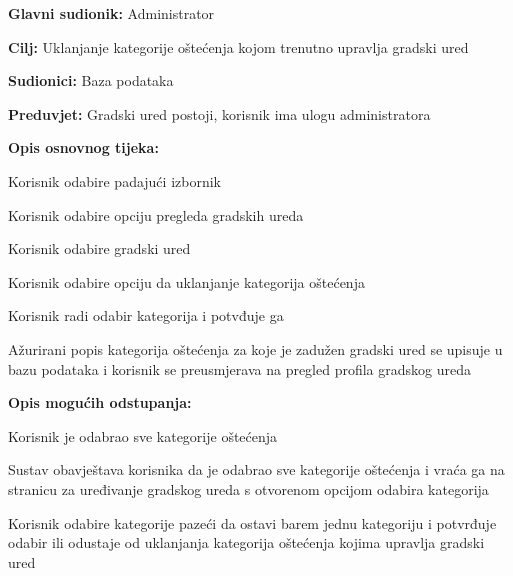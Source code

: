 \noindent {}
\begin{packed_item}

	\item \textbf{Glavni sudionik: }Administrator
	\item  \textbf{Cilj:} Uklanjanje kategorije oštećenja kojom trenutno upravlja gradski ured
	\item  \textbf{Sudionici:} Baza podataka
	\item  \textbf{Preduvjet:} Gradski ured postoji, korisnik ima ulogu administratora
	\item  \textbf{Opis osnovnog tijeka:}

	\item[] \begin{packed_enum}

		\item Korisnik odabire padajući izbornik
		\item Korisnik odabire opciju pregleda gradskih ureda
		\item Korisnik odabire gradski ured
		\item Korisnik odabire opciju da uklanjanje kategorija oštećenja
		\item Korisnik radi odabir kategorija i potvđuje ga
		\item Ažurirani popis kategorija oštećenja za koje je zadužen gradski ured se upisuje u bazu podataka i korisnik se preusmjerava na pregled profila gradskog ureda
	\end{packed_enum}

	\item  \textbf{Opis mogućih odstupanja:}

	\item[] \begin{packed_item}

		\item[5.a] Korisnik je odabrao sve kategorije oštećenja 
		\item[] \begin{packed_enum}

			\item Sustav obavještava korisnika da je odabrao sve kategorije oštećenja i vraća ga na stranicu za uređivanje gradskog ureda s otvorenom opcijom odabira kategorija
			\item Korisnik odabire kategorije pazeći da ostavi barem jednu kategoriju i potvrđuje odabir ili odustaje od uklanjanja kategorija oštećenja kojima upravlja gradski ured

		\end{packed_enum}
	\end{packed_item}
\end{packed_item}


